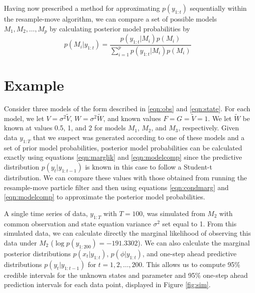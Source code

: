 \documentclass{article}
\begin{document}
Having now prescribed a method for approximating $p(y_{1:t})$ sequentially within the resample-move algorithm, we can compare a set of possible models ${M_1,M_2,\ldots,M_p}$ by calculating posterior model probabilities by
\begin{equation}
p(M_i|y_{1:t}) = \frac{p(y_{1:t}|M_i)p(M_i)}{\sum_{i=1}^p p(y_{1:t}|M_i)p(M_i)} \label{eqn:modelcomp}
\end{equation}

\section{Example}

Consider three models of the form described in \eqref{eqn:obs} and \eqref{eqn:state}. For each model, we let $V = \sigma^2\tilde{V}$, $W = \sigma^2\tilde{W}$, and known values $F = G = \tilde{V} = 1$. We let $\tilde{W}$ be known at values 0.5, 1, and 2 for models $M_1$, $M_2$, and $M_3$, respectively. Given data $y_{1:T}$ that we suspect was generated according to one of these models and a set of prior model probabilities, posterior model probabilities can be calculated exactly using equations \eqref{eqn:marglik} and \eqref{eqn:modelcomp} since the predictive distribution $p(y_t|y_{1:t-1})$ is known in this case to follow a Student-t distribution. We can compare these values with those obtained from running the resample-move particle filter and then using equations \eqref{eqn:condmarg} and \eqref{eqn:modelcomp} to approximate the posterior model probabilities.

A single time series of data, $y_{1:T}$ with $T = 100$, was simulated from $M_2$ with common observation and state equation variance $\sigma^2$ set equal to 1. From this simulated data, we can calculate directly the marginal likelihood of observing this data under $M_2$ ($\log p(y_{1:200}) = -191.3302$). We can also calculate the marginal posterior distributions $p(x_t|y_{1:t})$, $p(\phi|y_{1:t})$, and one-step ahead predictive distributions $p(y_t|y_{1:t-1})$ for $t = 1,2,\ldots,200$. This allows us to compute 95\% credible intervals for the unknown states and parameter and 95\% one-step ahead prediction intervals for each data point, displayed in Figure \ref{fig:sim}.
\end{document}
